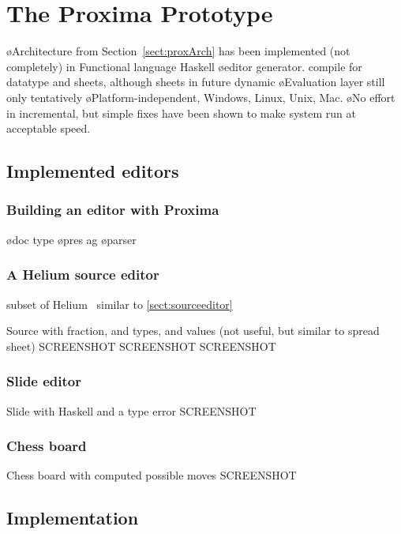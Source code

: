 \chapter{The Proxima Prototype} \label{chap:prototype}

\bl
\o Architecture from Section~\ref{sect:proxArch} has been implemented (not completely) in Functional language Haskell
\o editor generator. compile for datatype and sheets, although sheets in future dynamic
\o Evaluation layer still only tentatively
\o Platform-independent, Windows, Linux,  Unix, Mac. 
\o No effort in incremental, but simple fixes have been shown to make system run at acceptable speed.
\el

\section{Implemented editors}


\subsection{Building an editor with Proxima}

\bl
\o doc type
\o pres ag
\o parser
\el

\subsection{A Helium source editor}
subset of Helium~\cite{heeren03helium} similar to \ref{sect:sourceeditor}

Source with fraction, and types, and values (not useful, but similar to spread sheet)
SCREENSHOT
SCREENSHOT
SCREENSHOT
\subsection{Slide editor}

Slide with Haskell and a type error
SCREENSHOT
\subsection{Chess board}

Chess board with computed possible moves
SCREENSHOT



\section{Implementation}


